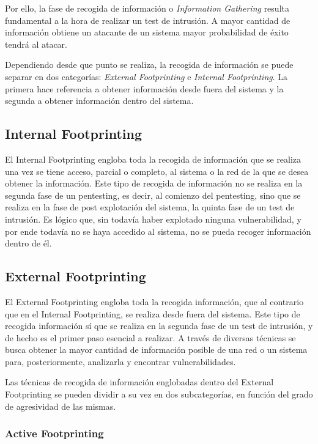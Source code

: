 Por ello, la fase de recogida de información o \textit{Information Gathering} resulta fundamental a la hora de realizar un test de intrusión. A mayor cantidad de información obtiene un atacante de un sistema mayor probabilidad de éxito tendrá al atacar.

Dependiendo desde que punto se realiza, la recogida de información se puede separar en dos categorías: \textit{External Footprinting} e \textit{Internal Footprinting}. La primera hace referencia a obtener información desde fuera del sistema y la segunda a obtener información dentro del sistema.

\subsection{Internal Footprinting}

El Internal Footprinting engloba toda la recogida de información que se realiza una vez se tiene acceso, parcial o completo, al sistema o la red de la que se desea obtener la información. Este tipo de recogida de información no se realiza en la segunda fase de un pentesting, es decir, al comienzo del pentesting, sino que se realiza en la fase de post explotación del sistema, la quinta fase de un test de intrusión. Es lógico que, sin todavía haber explotado ninguna vulnerabilidad, y por ende todavía no se haya accedido al sistema, no se pueda recoger información dentro de él.

\subsection{External Footprinting}

El External Footprinting engloba toda la recogida información, que al contrario que en el Internal Footprinting, se realiza desde fuera del sistema. Este tipo de recogida información sí que se realiza en la segunda fase de un test de intrusión, y de hecho es el primer paso esencial a realizar. A través de diversas técnicas se busca obtener la mayor cantidad de información posible de una red o un sistema para, posteriormente, analizarla y encontrar vulnerabilidades.

Las técnicas de recogida de información englobadas dentro del External Footprinting se pueden dividir a su vez en dos subcategorías, en función del grado de agresividad de las mismas. 

\subsubsection{Active Footprinting}

